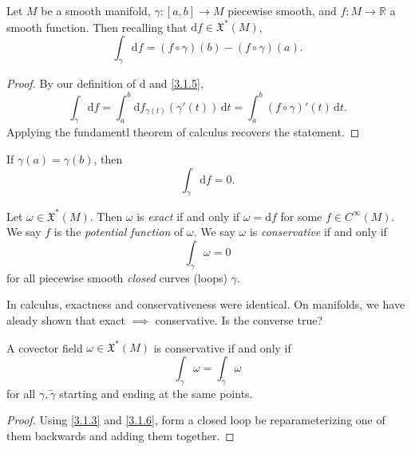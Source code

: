 \begin{theorem}\label{3.1.8}
	Let $M$ be a smooth manifold, $\gamma : [a,b] \to M$ piecewise smooth, and $f : M \to \mathbb{R} $ a smooth function. Then recalling that $\mathrm{d} f\in \mathfrak{X} ^*(M)$,
	\[
		\int_\gamma \mathrm{d} f = (f\circ \gamma )(b)-(f\circ \gamma )(a)
	.\]
\end{theorem}
\begin{proof}
	By our definition of d and \cref{3.1.5},
	\[
		\int_\gamma  \mathrm{d} f = \int_a^b \mathrm{d} f_{\gamma (t)} (\gamma '(t)) \,\mathrm{d} t = \int_a^b (f\circ \gamma )'(t) \,\mathrm{d} t
	.\]
	Applying the fundamentl theorem of calculus recovers the statement.
\end{proof}
\begin{corollary}\label{3.1.9}
	If $\gamma (a)=\gamma (b)$, then
	\[
		\int_\gamma \mathrm{d} f =0
	.\]
\end{corollary}

\begin{definition}\label{3.1.10}
	Let $\omega \in \mathfrak{X} ^*(M)$. Then $\omega $ is \emph{exact} if and only if $\omega =\mathrm{d} f$ for some $f\in C^\infty (M)$. We say $f$ is the \emph{potential function} of $\omega $. We say $\omega $ is \emph{conservative} if and only if
	\[
		\int_\gamma  \omega =0
	\]
	for all piecewise smooth \emph{closed} curves (loops) $\gamma $.
\end{definition}

In calculus, exactness and conservativeness were identical. On manifolds, we have aleady shown that exact $\implies $ conservative. Is the converse true?

\begin{proposition}\label{3.1.11}
	A covector field $\omega \in \mathfrak{X} ^*(M)$ is conservative if and only if
	\[
		\int_\gamma \omega =\int_{\widetilde{\gamma } } \omega 
	\]
	for all $\gamma ,\widetilde{\gamma } $ starting and ending at the same points.
\end{proposition}
\begin{proof}
	Using \cref{3.1.3} and \cref{3.1.6}, form a closed loop be reparameterizing one of them backwards and adding them together.
\end{proof}

